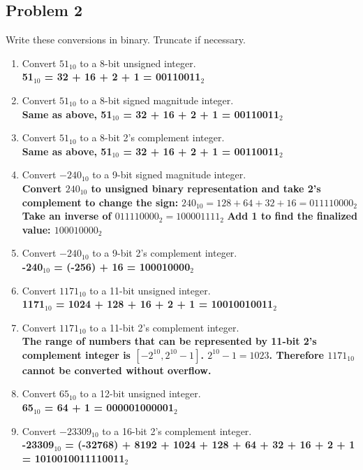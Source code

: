 \documentclass{article}
\begin{document}
\subsection*{Problem 2}
Write these conversions in binary. Truncate if necessary.
\begin{enumerate}[label=\alph*.]
    \item Convert $51_{10}$ to a 8-bit unsigned integer.\\
    \textbf{51$_{10}$ = 32 + 16 + 2 + 1 = 00110011$_2$}
    \item Convert $51_{10}$ to a 8-bit signed magnitude integer.\\
    \textbf{Same as above, 51$_{10}$ = 32 + 16 + 2 + 1 = 00110011$_2$}
    \item Convert $51_{10}$ to a 8-bit 2's complement integer.\\
    \textbf{Same as above, 51$_{10}$ = 32 + 16 + 2 + 1 = 00110011$_2$}
    \item Convert $-240_{10}$ to a 9-bit signed magnitude integer.\\
    \textbf{Convert $240_{10}$ to unsigned binary representation and take 2's complement to change the sign:}
    \newline\textbf{$240_{10} = 128 + 64 + 32 + 16 = 0 1111 0000_2$}
    \newline\textbf{Take an inverse of $0 1111 0000_2 = 1 0000 1111_2$}
    \newline\textbf{Add 1 to find the finalized value: $1 0001 0000_2$}
    \item Convert $-240_{10}$ to a 9-bit 2's complement integer.\\
    \textbf{-240$_{10}$ = (-256) + 16 = 100010000$_2$}
    \item Convert $1171_{10}$ to a 11-bit unsigned integer.\\
    \textbf{1171$_{10}$ = 1024 + 128 + 16 + 2 + 1 = 10010010011$_2$}
    \item Convert $1171_{10}$ to a 11-bit 2's complement integer.\\
    \textbf{The range of numbers that can be represented by 11-bit 2's complement integer is $[-2^{10}, 2^{10}-1]$. $2^{10}-1 = 1023$. Therefore $1171_{10}$ cannot be converted without overflow.}
    \item Convert $65_{10}$ to a 12-bit unsigned integer.\\
    \textbf{65$_{10}$ = 64 + 1 = 000001000001$_2$}
    \item Convert $-23309_{10}$ to a 16-bit 2's complement integer.\\
    \textbf{-23309$_{10}$ = (-32768) + 8192 + 1024 + 128 + 64 + 32 + 16 + 2 + 1 = 1010010011110011$_2$}
\end{enumerate}
\end{document}
